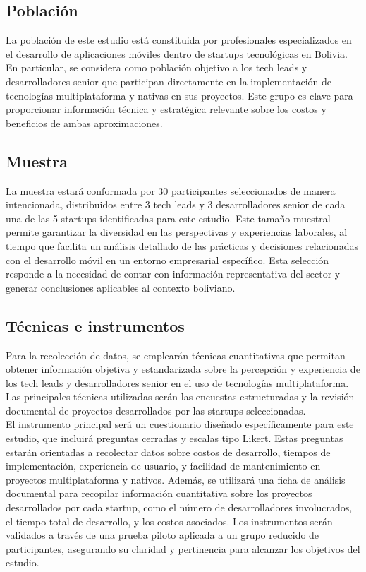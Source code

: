 \subsection{Población}
La población de este estudio está constituida por profesionales
especializados en el desarrollo de aplicaciones móviles dentro de startups
tecnológicas en Bolivia. En particular, se considera como población
objetivo a los tech leads y desarrolladores senior que participan
directamente en la implementación de tecnologías multiplataforma y
nativas en sus proyectos. Este grupo es clave para proporcionar
información técnica y estratégica relevante sobre los costos y
beneficios de ambas aproximaciones.\\

\subsection{Muestra}
La muestra estará conformada por 30 participantes seleccionados
de manera intencionada, distribuidos entre 3 tech leads y 3
desarrolladores senior de cada una de las 5 startups identificadas
para este estudio. Este tamaño muestral permite garantizar
la diversidad en las perspectivas y experiencias laborales,
al tiempo que facilita un análisis detallado de las prácticas
y decisiones relacionadas con el desarrollo móvil en un entorno
empresarial específico. Esta selección responde a la necesidad
de contar con información representativa del sector y generar
conclusiones aplicables al contexto boliviano.


\subsection{Técnicas e instrumentos}
Para la recolección de datos, se emplearán técnicas cuantitativas que
permitan obtener información objetiva y estandarizada sobre la percepción y
experiencia de los tech leads y desarrolladores senior en el uso de tecnologías
multiplataforma. Las principales técnicas utilizadas serán las encuestas
estructuradas y la revisión documental de proyectos desarrollados por
las startups seleccionadas.\\

El instrumento principal será un cuestionario diseñado específicamente para
este estudio, que incluirá preguntas cerradas y escalas tipo Likert.
Estas preguntas estarán orientadas a recolectar datos sobre costos de
desarrollo, tiempos de implementación, experiencia de usuario, y
facilidad de mantenimiento en proyectos multiplataforma y nativos.
Además, se utilizará una ficha de análisis documental para recopilar
información cuantitativa sobre los proyectos desarrollados por cada
startup, como el número de desarrolladores involucrados, el tiempo
total de desarrollo, y los costos asociados. Los instrumentos serán
validados a través de una prueba piloto aplicada a un grupo reducido
de participantes, asegurando su claridad y pertinencia para alcanzar
los objetivos del estudio.

